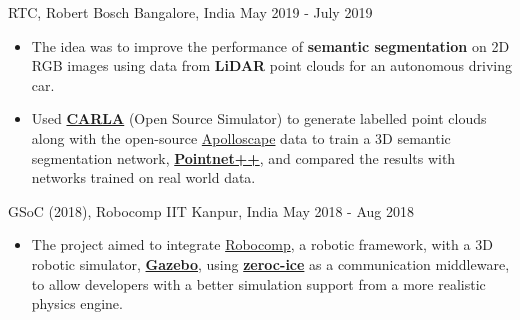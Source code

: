 \documentclass[a4paper]{MagicalCV}
\begin{document}
\begin{minipage}[t]{0.49\textwidth}
\begin{cventries}
    \cventry
      {}
      {RTC, Robert Bosch}
      {Bangalore, India}
      {May 2019 - July 2019}
      {
         \vspace*{-\baselineskip}
         \item \hspace{2pt} 
          \begin{itemize}[leftmargin=6mm]
            \item The idea was to improve the performance of \textbf{semantic segmentation} on 2D RGB images using data from \textbf{LiDAR} point clouds for an autonomous driving car.
            \item Used \href{https://carla.org/}{\textbf{CARLA}} (Open Source Simulator) to generate labelled point clouds along with the open-source \href{https://apolloscape.auto/}{Apolloscape} data to train a 3D semantic segmentation network, \href{https://github.com/charlesq34/pointnet2}{\textbf{Pointnet++}}, and compared the results with networks trained on real world data.
          \end{itemize}
      }

\cventry
  {}
  {GSoC (2018), Robocomp}
  {IIT Kanpur, India}
  {May 2018 - Aug 2018}
  {
    \vspace*{-\baselineskip}
    \item \hspace{2pt} 
    \begin{itemize}[leftmargin=6mm]
        \item The project aimed to integrate \href{https://robocomp.github.io/web/}{Robocomp}, a robotic framework, with a 3D robotic simulator, \href{http://gazebosim.org}{\textbf{Gazebo}}, using \href{https://doc.zeroc.com/ice/3.6/}{\textbf{zeroc-ice}} as a communication middleware, to allow developers with a better simulation support from a more realistic physics engine.
    \end{itemize}
    }

\end{cventries}

\vspace*{-\baselineskip}



\end{minipage}
\end{document}
